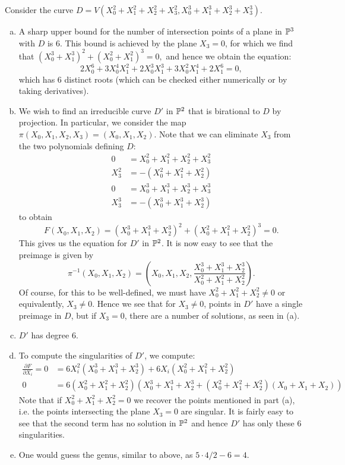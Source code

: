 \documentclass{../../mathnotes}
\begin{document}
Consider the curve $D=V(X_0^2+X_1^2+X_2^2+X_3^2,X_0^3+X_1^3+X_2^3+X_3^3)$.
\begin{enumerate}[(a)]
    \item A sharp upper bound for the number of intersection points of a plane in $\mathbb{P}^3$ with $D$
        is 6. This bound is achieved by the plane $X_3=0$, for which we find that
        $(X_0^3+X_1^3)^2+(X_0^2+X_1^2)^3=0,$ and hence we obtain the equation:
        \[2X_0^6+3X_0^4X_1^2+2X_0^3X_1^3+3X_0^2X_1^4+2X_1^6=0,\]
        which has 6 distinct roots (which can be checked either numerically or by taking derivatives).
    \item We wish to find an irreducible curve $D'$ in $\mathbb{P}^2$ that is birational to $D$ by projection.
        In particular, we consider the map $\pi(X_0,X_1,X_2,X_3)=(X_0,X_1,X_2)$. Note that we can
        eliminate $X_3$ from the two polynomials defining $D$:
        \begin{align*}
            0&=X_0^2+X_1^2+X_2^2+X_3^2\\
            X_3^2&=-(X_0^2+X_1^2+X_2^2)\\
            0&=X_0^3+X_1^3+X_2^3+X_3^3\\
            X_3^3&=-(X_0^3+X_1^3+X_2^3)
        \end{align*}
        to obtain
        \[F(X_0,X_1,X_2)=(X_0^3+X_1^3+X_2^3)^2+(X_0^2+X_1^2+X_2^2)^3=0.\]
        This gives us the equation for $D'$ in $\mathbb{P}^2$. It is now easy to see that the preimage is given by
        \[\pi^{-1}(X_0,X_1,X_2)=\left(X_0,X_1,X_2,\frac{X_0^3+X_1^3+X_2^3}{X_0^2+X_1^2+X_2^2}\right).\]
        Of course, for this to be well-defined, we must have $X_0^2+X_1^2+X_2^2\neq 0$ or equivalently,
        $X_3\neq0$. Hence we see that for $X_3\neq0$, points in $D'$ have a single preimage in $D$, but
        if $X_3=0$, there are a number of solutions, as seen in (a).
    \item $D'$ has degree 6.
    \item To compute the singularities of $D'$, we compute:
        \begin{align*}
            \frac{\partial F}{\partial X_i}=0&=6X_i^2(X_0^3+X_1^3+X_2^3)+6X_i(X_0^2+X_1^2+X_2^2)\\
            0&=6(X_0^2+X_1^2+X_2^2)(X_0^3+X_1^3+X_2^3+(X_0^2+X_1^2+X_2^2)(X_0+X_1+X_2))
        \end{align*}
        Note that if $X_0^2+X_1^2+X_2^2=0$ we recover the points mentioned in part (a), i.e. the points intersecting
        the plane $X_3=0$ are singular. It is fairly easy to see that the second term has no solution in $\mathbb{P}^2$ and
        hence $D'$ has only these 6 singularities.
    \item One would guess the genus, similar to above, as $5\cdot 4/2-6=4$.
\end{enumerate}
\end{document}
